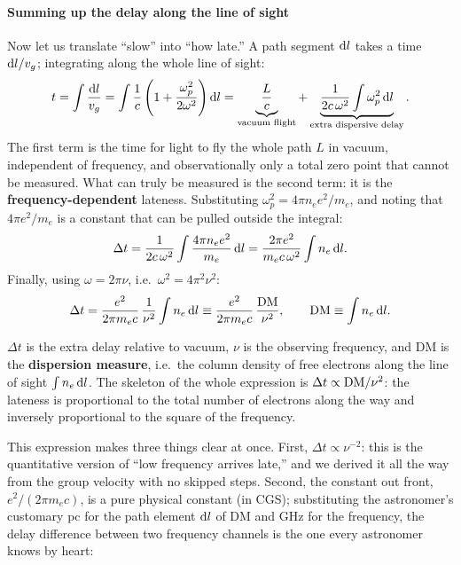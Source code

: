 \paragraph{Summing up the delay along the line of sight}
\label{sec:e21-dmderive}

Now let us translate ``slow'' into ``how late.'' A path segment \({\rm d}l\) takes a time \({\rm d}l/v_g\); integrating along the whole line of sight:
\[
  t=\int\frac{{\rm d}l}{v_g}
   =\int\frac{1}{c}\left(1+\frac{\omega_p^2}{2\omega^2}\right){\rm d}l
   =\underbrace{\frac{L}{c}}_{\text{vacuum flight}}
   +\underbrace{\frac{1}{2c\,\omega^2}\int\omega_p^2\,{\rm d}l}_{\text{extra dispersive delay}} .
\]
The first term is the time for light to fly the whole path \(L\) in vacuum, independent of frequency, and observationally only a total zero point that cannot be measured. What can truly be measured is the second term: it is the \textbf{frequency-dependent} lateness. Substituting \(\omega_p^2=4\pi n_e e^2/m_e\), and noting that \(4\pi e^2/m_e\) is a constant that can be pulled outside the integral:
\[
  \Delta t
  =\frac{1}{2c\,\omega^2}\int\frac{4\pi n_e e^2}{m_e}\,{\rm d}l
  =\frac{2\pi e^2}{m_e c\,\omega^2}\int n_e\,{\rm d}l .
\]
Finally, using \(\omega=2\pi\nu\), i.e.\ \(\omega^2=4\pi^2\nu^2\):
\begin{equation}
  \Delta t
  =\frac{e^2}{2\pi m_e c}\,\frac{1}{\nu^2}\int n_e\,{\rm d}l
  \equiv \frac{e^2}{2\pi m_e c}\,\frac{{\rm DM}}{\nu^2},
  \qquad
  {\rm DM}\equiv\int n_e\,{\rm d}l .
  \label{eq:e21-dm-delay}
\end{equation}
\begin{formulaexplain}
\(\Delta t\) is the extra delay relative to vacuum, \(\nu\) is the observing frequency, and DM is the \textbf{dispersion measure}, i.e.\ the column density of free electrons along the line of sight \(\int n_e\,{\rm d}l\). The skeleton of the whole expression is \(\Delta t\propto {\rm DM}/\nu^{2}\): the lateness is proportional to the total number of electrons along the way and inversely proportional to the square of the frequency.
\end{formulaexplain}
This expression makes three things clear at once. First, \(\Delta t\propto\nu^{-2}\): this is the quantitative version of ``low frequency arrives late,'' and we derived it all the way from the group velocity with no skipped steps. Second, the constant out front, \(e^2/(2\pi m_e c)\), is a pure physical constant (in CGS); substituting the astronomer's customary pc for the path element \({\rm d}l\) of DM and GHz for the frequency, the delay difference between two frequency channels is the one every astronomer knows by heart:
